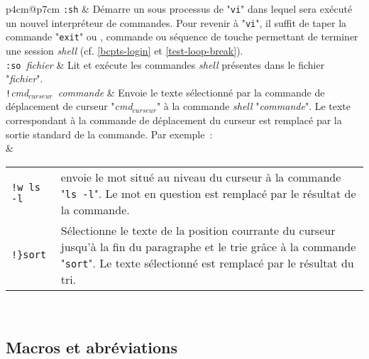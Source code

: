 \begin{longtable}{p{4cm}@{\hspace{0.5cm}}p{7cm}}
	\verb*=:sh=									&
		D{\'e}marre un sous processus de "{\tt vi}" dans lequel sera
		ex{\'e}cut{\'e} un nouvel interpr{\'e}teur de commandes. Pour revenir {\`a}
		"{\tt vi}", il suffit de taper la commande "{\tt exit}"
		ou , commande ou s{\'e}quence de touche permettant
		de terminer une session {\sl shell} (cf. \ref{bcpts-login}
		et \ref{test-loop-break}).
		\\[2ex]
	\verb*=:so ={\sl fichier}						&
		Lit et ex{\'e}cute les commandes {\sl shell} pr{\'e}sentes dans le
		fichier "{\sl fichier}".
		\\[2ex]
	\verb*=!={\sl cmd$_{curseur}$\verb*= =commande}	&
		Envoie le texte s{\'e}lectionn{\'e} par la commande de d{\'e}placement
		de curseur "{\sl cmd$_{curseur}$}" {\`a} la commande {\sl shell}
		"{\sl commande}". Le texte correspondant {\`a} la commande
		de d{\'e}placement du curseur est remplac{\'e} par la sortie standard
		de la commande. Par exemple~:
		\\[2ex]
		&
		\begin{tabular}{l@{\hspace{1ex}}p{5cm}}
			\verb*=!w ls -l={\returnkey} 	&
			envoie le mot situ{\'e} au niveau du curseur {\`a} la commande
			"{\tt ls -l}". Le mot en question est remplac{\'e} par
			le r{\'e}sultat de la commande.
			\\[2ex]
			\verb*=!}sort={\returnkey}		&
			S{\'e}lectionne le texte de la position courrante du curseur
			jusqu'{\`a} la fin du paragraphe et le trie gr{\^a}ce {\`a} la commande
			"{\tt sort}". Le texte s{\'e}lectionn{\'e} est remplac{\'e} par le
			r{\'e}sultat du tri.
		\end{tabular}
		\\[2ex]
\end{longtable}

\subsection{\label{ann-edt-vi-macros}Macros et abr{\'e}viations}


